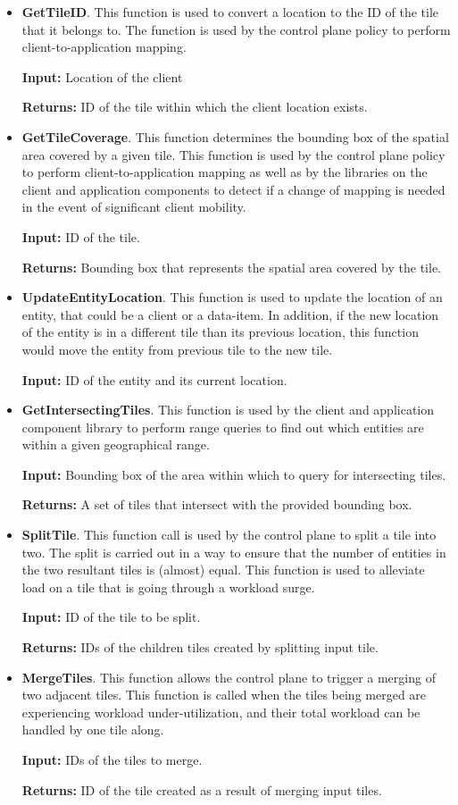 \begin{itemize}
\item \textbf{GetTileID}. This function is used to convert a location to the ID of the tile that it belongs to. The function is used by the control plane policy to perform client-to-application mapping.
\par \noindent \textbf{Input:} Location of the client
\par \noindent \textbf{Returns: }ID of the tile within which the client location exists.
\item \textbf{GetTileCoverage}. This function determines the bounding box of the spatial area covered by a given tile. This function is used by the control plane policy to perform client-to-application mapping as well as by the libraries on the client and application components to detect if a change of mapping is needed in the event of significant client mobility. 
\par \noindent \textbf{Input: }ID of the tile.
\par \noindent \textbf{Returns: }Bounding box that represents the spatial area covered by the tile.
\item \textbf{UpdateEntityLocation}. This function is used to update the location of an entity, that could be a client or a data-item. In addition, if the new location of the entity is in a different tile than its previous location, this function would move the entity from previous tile to the new tile. 
\par \noindent \textbf{Input: }ID of the entity and its current location.
\item \textbf{GetIntersectingTiles}. This function is used by the client and application component library to perform range queries to find out which entities are within a given geographical  range. 
\par \noindent \textbf{Input: } Bounding box of the area within which to query for intersecting tiles.
\par \noindent \textbf{Returns: } A set of tiles that intersect with the provided bounding box.
\item \textbf{SplitTile}. This function call is used by the control plane to split a tile into two. The split is carried out in a way to ensure that the number of entities in the two resultant tiles is (almost) equal. This function is used to alleviate load on a tile that is going through a workload surge.
\par \noindent \textbf{Input: } ID of the tile to be split.
\par \noindent \textbf{Returns: } IDs of the children tiles created by splitting input tile.
\item \textbf{MergeTiles}. This function allows the control plane to trigger a merging of two adjacent tiles. This function is called when the tiles being merged are experiencing workload under-utilization, and their total workload can be handled by one tile along.
\par \noindent \textbf{Input: } IDs of the tiles to merge.
\par \noindent \textbf{Returns: } ID of the tile created as a result of merging input tiles.
\end{itemize}

